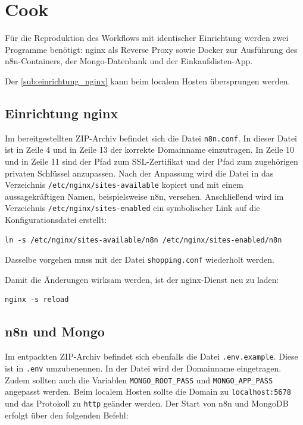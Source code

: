 \section{Cook}\label{sec:cook} %
Für die Reproduktion des Workflows mit identischer Einrichtung werden zwei Programme benötigt: nginx
als Reverse Proxy sowie Docker zur Ausführung des n8n-Containers, der Mongo-Datenbank und der
Einkaufslisten-App.

Der \autoref{sub:einrichtung_nginx} kann beim localem Hosten übersprungen werden.

\subsection{Einrichtung nginx}\label{sub:einrichtung_nginx} %
Im bereitgestellten ZIP-Archiv befindet sich die Datei \verb|n8n.conf|. In dieser Datei ist in Zeile 4
und in Zeile 13 der korrekte Domainname einzutragen. In Zeile 10 und in Zeile 11 sind der Pfad zum
SSL-Zertifikat und der Pfad zum zugehörigen privaten Schlüssel anzupassen. Nach der Anpassung wird
die Datei in das Verzeichnis \verb|/etc/nginx/sites-available| kopiert und mit einem aussagekräftigen
Namen, beispielsweise n8n, versehen. Anschließend wird im Verzeichnis
\verb|/etc/nginx/sites-enabled| ein
symbolischer Link auf die Konfigurationsdatei erstellt:

\begin{verbatim}
ln -s /etc/nginx/sites-available/n8n /etc/nginx/sites-enabled/n8n
\end{verbatim}

Dasselbe vorgehen muss mit der Datei \verb|shopping.conf| wiederholt werden.

Damit die Änderungen wirksam werden, ist der nginx-Dienst neu zu laden:

\begin{verbatim}
nginx -s reload
\end{verbatim}

\subsection{n8n und Mongo}\label{sub:n_n_und_mongo} %
Im entpackten ZIP-Archiv befindet sich ebenfalls die Datei \verb|.env.example|. Diese ist in
\verb|.env| umzubenennen. In der Datei wird der Domainname eingetragen. Zudem sollten auch die
Variablen \verb|MONGO_ROOT_PASS| und \verb|MONGO_APP_PASS| angepasst werden. Beim localem Hosten
sollte die Domain zu \verb|localhost:5678| und das Protokoll zu \verb|http| geänder werden. Der
Start von n8n und MongoDB erfolgt über den folgenden Befehl:

